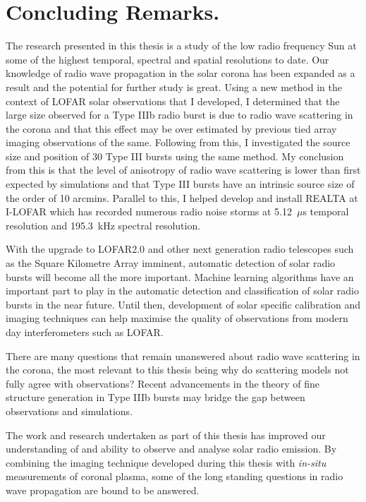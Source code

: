 \section{Concluding Remarks.}
The research presented in this thesis is a study of the low radio frequency Sun at some of the highest temporal, spectral and spatial resolutions to date. Our knowledge of radio wave propagation in the solar corona has been expanded as a result and the potential for further study is great. Using a new method in the context of LOFAR solar observations that I developed, I determined that the large size observed for a Type IIIb radio burst is due to radio wave scattering in the corona and that this effect may be over estimated by previous tied array imaging observations of the same. Following from this, I investigated the source size and position of 30 Type III bursts using the same method. My conclusion from this is that the level of anisotropy of radio wave scattering is lower than first expected by simulations and that Type III bursts have an intrinsic source size of the order of 10 arcmins. Parallel to this, I helped develop and install REALTA at I-LOFAR which has recorded numerous radio noise storms at 5.12~$\mu$s temporal resolution and 195.3~kHz spectral resolution. 

With the upgrade to LOFAR2.0 and other next generation radio telescopes such as the Square Kilometre Array \citep[SKA;][]{McMullin2020} imminent, automatic detection of solar radio bursts will become all the more important. Machine learning algorithms have an important part to play in the automatic detection and classification of solar radio bursts in the near future. Until then, development of solar specific calibration and imaging techniques can help maximise the quality of observations from modern day interferometers such as LOFAR.  

There are many questions that remain unanswered about radio wave scattering in the corona, the most relevant to this thesis being why do scattering models not fully agree with observations? Recent advancements in the theory of fine structure generation in Type IIIb bursts may bridge the gap between observations and simulations.

The work and research undertaken as part of this thesis has improved our understanding of and ability to observe and analyse solar radio emission. By combining the imaging technique developed during this thesis with \textit{in-situ} measurements of coronal plasma, some of the long standing questions in radio wave propagation are bound to be answered. 














